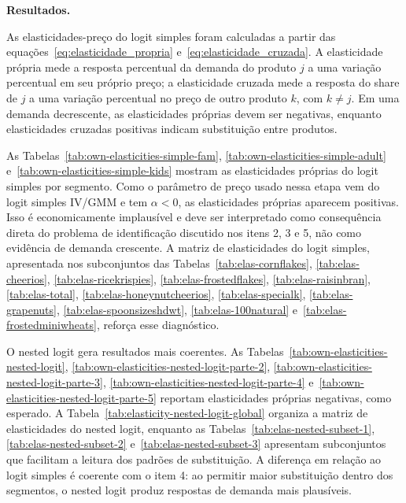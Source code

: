 \documentclass[12pt,a4paper]{article}
\begin{document}
\begin{enumerate}
\textbf{Resultados.}

As elasticidades-preço do logit simples foram calculadas a partir das equações~\eqref{eq:elasticidade_propria} e~\eqref{eq:elasticidade_cruzada}. A elasticidade própria mede a resposta percentual da demanda do produto \(j\) a uma variação percentual em seu próprio preço; a elasticidade cruzada mede a resposta do share de \(j\) a uma variação percentual no preço de outro produto \(k\), com \(k\neq j\). Em uma demanda decrescente, as elasticidades próprias devem ser negativas, enquanto elasticidades cruzadas positivas indicam substituição entre produtos.

As Tabelas~\ref{tab:own-elasticities-simple-fam}, \ref{tab:own-elasticities-simple-adult} e~\ref{tab:own-elasticities-simple-kids} mostram as elasticidades próprias do logit simples por segmento. Como o parâmetro de preço usado nessa etapa vem do logit simples IV/GMM e tem \(\alpha<0\), as elasticidades próprias aparecem positivas. Isso é economicamente implausível e deve ser interpretado como consequência direta do problema de identificação discutido nos itens 2, 3 e 5, não como evidência de demanda crescente. A matriz de elasticidades do logit simples, apresentada nos subconjuntos das Tabelas~\ref{tab:elas-cornflakes}, \ref{tab:elas-cheerios}, \ref{tab:elas-ricekrispies}, \ref{tab:elas-frostedflakes}, \ref{tab:elas-raisinbran}, \ref{tab:elas-total}, \ref{tab:elas-honeynutcheerios}, \ref{tab:elas-specialk}, \ref{tab:elas-grapenuts}, \ref{tab:elas-spoonsizeshdwt}, \ref{tab:elas-100natural} e~\ref{tab:elas-frostedminiwheats}, reforça esse diagnóstico.

O nested logit gera resultados mais coerentes. As Tabelas~\ref{tab:own-elasticities-nested-logit}, \ref{tab:own-elasticities-nested-logit-parte-2}, \ref{tab:own-elasticities-nested-logit-parte-3}, \ref{tab:own-elasticities-nested-logit-parte-4} e~\ref{tab:own-elasticities-nested-logit-parte-5} reportam elasticidades próprias negativas, como esperado. A Tabela~\ref{tab:elasticity-nested-logit-global} organiza a matriz de elasticidades do nested logit, enquanto as Tabelas~\ref{tab:elas-nested-subset-1}, \ref{tab:elas-nested-subset-2} e~\ref{tab:elas-nested-subset-3} apresentam subconjuntos que facilitam a leitura dos padrões de substituição. A diferença em relação ao logit simples é coerente com o item 4: ao permitir maior substituição dentro dos segmentos, o nested logit produz respostas de demanda mais plausíveis.


\end{enumerate}
\end{document}

